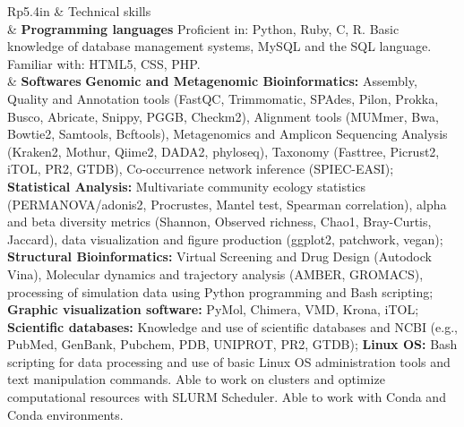 \documentclass[letterpaper, 11pt]{article}
\newcommand{\headingfont}{\Large\color{OliveGreen}}
\newenvironment{SectionTable}[1]{
	\renewcommand*{\arraystretch}{1.7}
	\setlength{\tabcolsep}{10pt}
	\begin{longtable}{Rp{5.4in}} & #1 \\}
{\end{longtable}\vspace{-.3cm}}
\begin{document}
\begin{SectionTable}{\headingfont Technical skills}
& \textbf{Programming languages} \newline
Proficient in: Python, Ruby, C, R. \newline
Basic knowledge of database management systems, MySQL and the SQL language. \newline
Familiar with: HTML5, CSS, PHP. \\
& \textbf{Softwares} \newline
\textbf{Genomic and Metagenomic Bioinformatics:} Assembly, Quality and Annotation tools (FastQC, Trimmomatic, SPAdes, Pilon, Prokka, Busco, Abricate, Snippy, PGGB, Checkm2), Alignment tools (MUMmer, Bwa, Bowtie2, Samtools, Bcftools), Metagenomics and Amplicon Sequencing Analysis (Kraken2, Mothur, Qiime2, DADA2, phyloseq), Taxonomy (Fasttree, Picrust2, iTOL, PR2, GTDB), Co-occurrence network inference (SPIEC-EASI); \newline
\textbf{Statistical Analysis:} Multivariate community ecology statistics (PERMANOVA/adonis2, Procrustes, Mantel test, Spearman correlation), alpha and beta diversity metrics (Shannon, Observed richness, Chao1, Bray-Curtis, Jaccard), data visualization and figure production (ggplot2, patchwork, vegan); \newline
\textbf{Structural Bioinformatics:} Virtual Screening and Drug Design (Autodock Vina), Molecular dynamics and trajectory analysis (AMBER, GROMACS), processing of simulation data using Python programming and Bash scripting; \newline
\textbf{Graphic visualization software:} PyMol, Chimera, VMD, Krona, iTOL; \newline
\textbf{Scientific databases:} Knowledge and use of scientific databases and NCBI (e.g., PubMed, GenBank, Pubchem, PDB, UNIPROT, PR2, GTDB); \newline
\textbf{Linux OS:} Bash scripting for data processing and use of basic Linux OS administration tools and text manipulation commands. Able to work on clusters and optimize computational resources with SLURM Scheduler. Able to work with Conda and Conda environments.\\


\end{SectionTable}
\end{document}
